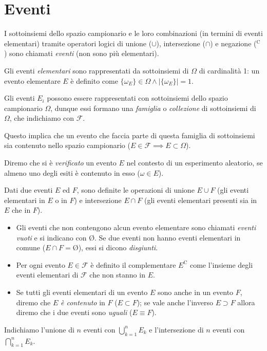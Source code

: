         \section{Eventi}\label{sec:Eventi}
        \begin{defn}
            I sottoinsiemi dello spazio campionario e le loro combinazioni (in termini di eventi elementari) tramite operatori logici di unione ($\cup$), intersezione ($\cap$) e negazione ($^{\text{C}}$) sono chiamati \emph{eventi} (non sono più elementari).
        \end{defn}
        \begin{obsv}
            Gli eventi \emph{elementari} sono rappresentati da sottoinsiemi di $\Omega$ di cardinalità 1: un evento elementare $E$ è definito come $\{\omega_E\} \in \Omega \land |\{\omega_E\}| = 1$.
        \end{obsv}
        \begin{defn}
            Gli eventi $E_i$ possono essere rappresentati con sottoinsiemi dello spazio campionario $\Omega$, dunque essi formano una \emph{famiglia} o \emph{collezione} di sottoinsiemi di $\Omega$, che indichiamo con $\mathscr{F}$.

            Questo implica che un evento che faccia parte di questa famiglia di sottoinsiemi sia contenuto nello spazio campionario ($E \in \mathscr{F} \implies E \subset \Omega$).

            Diremo che si è \emph{verificato} un evento $E$ nel contesto di un esperimento aleatorio, se almeno uno degli esiti è contenuto in esso ($\omega \in E$).
        \end{defn}
        \begin{defn}
            Dati due eventi $E$ ed $F$, sono definite le operazioni di unione $E \cup F$ (gli eventi elementari in $E$ o in $F$) e intersezione $E \cap F$ (gli eventi elementari presenti sia in $E$ che in $F$).
            \begin{itemize}
                \item Gli eventi che non contengono alcun evento elementare sono chiamati \emph{eventi vuoti} e si indicano con \O. Se due eventi non hanno eventi elementari in comune ($E \cap F = \text{\O}$), essi si dicono \emph{disgiunti}.
                \item Per ogni evento $E \in \mathscr{F}$ è definito il complementare $E^{\text{C}}$ come l'insieme degli eventi elementari di $\mathscr{F}$ che non stanno in $E$.
                \item Se tutti gli eventi elementari di un evento $E$ sono anche in un evento  $F$, diremo che $E$ \emph{è contenuto} in  $F$ ($E \subset F$); se vale anche l'inverso $E \supset F$ allora diremo che i due eventi sono \emph{uguali} ($E \equiv F$).
            \end{itemize}
            Indichiamo l'unione di $n$ eventi con  $\bigcup_{k=1}^{n} E_k$ e l'intersezione di  $n$ eventi con $\bigcap_{k=1}^{n} E_k$.
        \end{defn}
